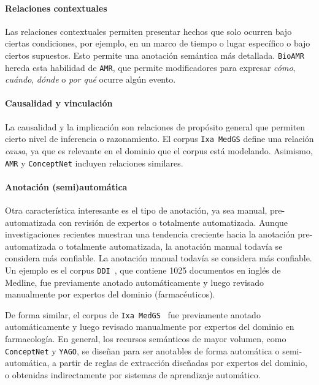 \paragraph{Relaciones contextuales}

Las relaciones contextuales permiten presentar hechos que solo ocurren bajo ciertas condiciones, por ejemplo, en un marco de tiempo o lugar específico o bajo ciertos supuestos. Esto permite una anotación semántica más detallada. \texttt{BioAMR} hereda esta habilidad de \texttt{AMR}, que permite modificadores para expresar \textit{cómo}, \textit{cuándo}, \textit{dónde} o \textit{por qué} ocurre algún evento.

\paragraph{Causalidad y vinculación}

La causalidad y la implicación son relaciones de propósito general que permiten cierto nivel de inferencia o razonamiento. El corpus \texttt{Ixa MedGS} define una relación \textit{causa}, ya que es relevante en el dominio que el corpus está modelando. Asimismo, \texttt{AMR} y \texttt{ConceptNet} incluyen relaciones similares.

\paragraph{Anotación (semi)automática}

Otra característica interesante es el tipo de anotación, ya sea manual, pre-automatizada con revisión de expertos o totalmente automatizada. Aunque investigaciones recientes muestran una tendencia creciente hacia la anotación pre-automatizada o totalmente automatizada, la anotación manual todavía se considera más confiable. La anotación manual todavía se considera más confiable.
Un ejemplo es el corpus \texttt{DDI}~\cite{herrero2013ddi}, que contiene 1025 documentos en inglés de Medline, fue previamente anotado automáticamente y luego revisado manualmente por expertos del dominio (farmacéuticos).

De forma similar, el corpus de \texttt{Ixa MedGS}~\cite{oronoz2015creation} fue previamente anotado automáticamente y luego revisado manualmente por expertos del dominio en farmacología.
En general, los recursos semánticos de mayor volumen, como \texttt{ConceptNet} y \texttt{YAGO}, se diseñan para ser anotables de forma automática o semi-automática, a partir de reglas de extracción diseñadas por expertos del dominio, o obtenidas indirectamente por sistemas de aprendizaje automático.

